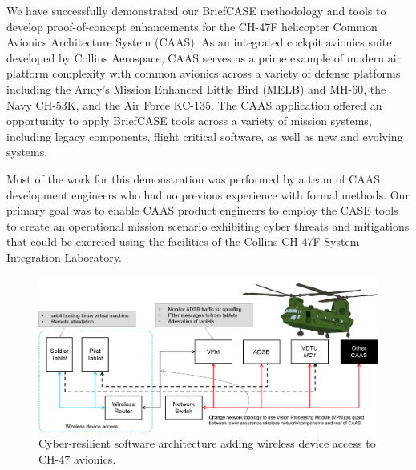 We have successfully demonstrated our BriefCASE methodology and tools to
develop proof-of-concept enhancements for the CH-47F helicopter Common Avionics
Architecture System (CAAS). As an integrated cockpit avionics suite developed by Collins Aerospace, CAAS serves
as a prime example of modern air platform complexity with common avionics across a variety of
defense platforms including the Army's Mission Enhanced Little Bird (MELB)  and MH-60, the
Navy CH-53K, and the Air Force KC-135. The CAAS application offered an opportunity to
apply BriefCASE tools across a variety of mission systems, including legacy components, flight critical
software, as well as new and evolving systems. 

Most of the work for this demonstration was 
performed by a team of CAAS development engineers who had no
previous experience with formal methods.
Our primary goal was to enable CAAS product engineers to employ the CASE tools to create an
operational mission scenario exhibiting cyber threats and mitigations that could be exercied using
the facilities of the Collins CH-47F System Integration Laboratory. 

\begin{figure}
	\begin{center}
	\includegraphics[width=\textwidth]{./figs/caas-arch.png}
        \end{center}
	\caption{Cyber-resilient software architecture adding wireless device access to CH-47 avionics.} 
	\label{fig:caas-arch} 
\end{figure}

